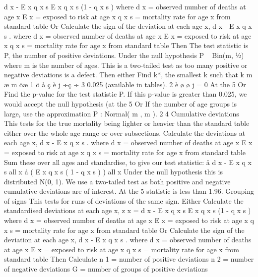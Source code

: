 \documentclass[a4paper,12pt]{article}
\begin{document}
d x - E x q x s
E x q x s (1 - q x s )
where
d x = observed number of deaths at age x
E x = exposed to risk at age x
q x s = mortality rate for age x from standard table
Or
Calculate the sign of the deviation at each age x, d x - E x q x s .
where
d x = observed number of deaths at age x
E x = exposed to risk at age x
q x s = mortality rate for age x from standard table
Then
The test statistic is P, the number of positive deviations.
Under the null hypothesis P ~ Bin(m, 1⁄2) where m is the number of ages.
This is a two-tailed test as too many positive or negative deviations is a defect.
Then either
Find k*, the smallest k such that
k
m
æ m öæ 1 ö
å ç è j ÷ç
÷ 3 0.025 (available in tables).
2
è
ø
ø
j = 0
At the 5%
Or
Find the p-value for the test statistic P.
If this p-value is greater than 0.025, we would accept the null hypothesis (at
the 5%
Or
If the number of age groups is large, use the approximation
P : Normal( m , m ).
2 4
Cumulative deviations
This tests for the true mortality being lighter or heavier than the standard table
either over the whole age range or over subsections.
Calculate the deviations at each age x, d x - E x q x s .
where
d x = observed number of deaths at age x
E x = exposed to risk at age x
q x s = mortality rate for age x from standard table
Sum these over all ages and standardise, to give our test statistic:
å d x - E x q x s
all x
å ( E x q x s ( 1 - q x s ) )
all x
Under the null hypothesis this is distributed N(0, 1).
We use a two-tailed test as both positive and negative cumulative deviations
are of interest.
At the 5%
statistic is less than 1.96.
Grouping of signs
This tests for runs of deviations of the same sign.
Either
Calculate the standardised deviations at each age x, z x =
d x - E x q x s
E x q x s (1 - q x s )
where
d x = observed number of deaths at age x
E x = exposed to risk at age x
q x s = mortality rate for age x from standard table
Or
Calculate the sign of the deviation at each age x, d x - E x q x s .
where
d x = observed number of deaths at age x
E x = exposed to risk at age x
q x s = mortality rate for age x from standard table
Then
Calculate n 1 = number of positive deviations
n 2 = number of negative deviations
G = number of groups of positive deviations
\end{document}
